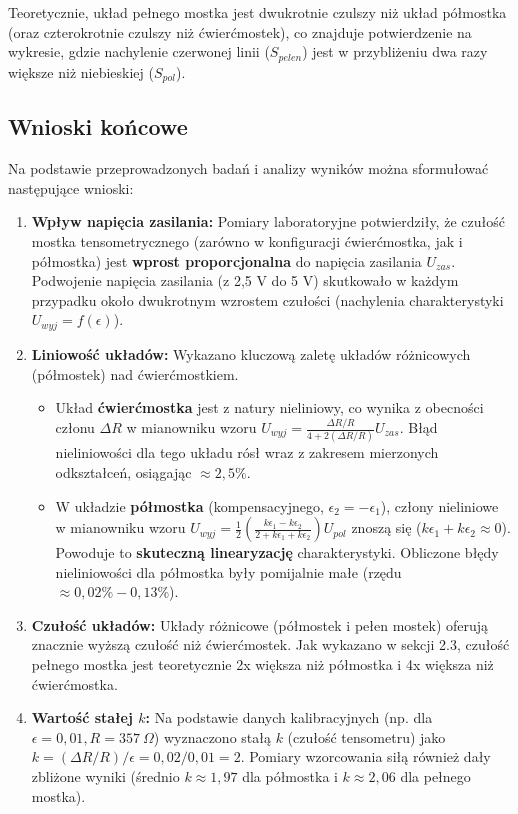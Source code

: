 \documentclass[12pt, a4paper]{article}
\begin{document}
	Teoretycznie, układ pełnego mostka jest dwukrotnie czulszy niż układ półmostka (oraz czterokrotnie czulszy niż ćwierćmostek), co znajduje potwierdzenie na wykresie, gdzie nachylenie czerwonej linii ($S_{pelen}$) jest w przybliżeniu dwa razy większe niż niebieskiej ($S_{pol}$).
	
	\subsection{Wnioski końcowe}
	
	Na podstawie przeprowadzonych badań i analizy wyników można sformułować następujące wnioski:
	
	\begin{enumerate}
		\item \textbf{Wpływ napięcia zasilania:} Pomiary laboratoryjne potwierdziły, że czułość mostka tensometrycznego (zarówno w konfiguracji ćwierćmostka, jak i półmostka) jest \textbf{wprost proporcjonalna} do napięcia zasilania $U_{zas}$. Podwojenie napięcia zasilania (z 2,5 V do 5 V) skutkowało w każdym przypadku około dwukrotnym wzrostem czułości (nachylenia charakterystyki $U_{wyj} = f(\epsilon)$).
		
		\item \textbf{Liniowość układów:} Wykazano kluczową zaletę układów różnicowych (półmostek) nad ćwierćmostkiem. 
		\begin{itemize}
			\item Układ \textbf{ćwierćmostka} jest z natury nieliniowy, co wynika z obecności członu $\Delta R$ w mianowniku wzoru $U_{wyj} = \frac{\Delta R/R}{4+2(\Delta R/R)}U_{zas}$. Błąd nieliniowości dla tego układu rósł wraz z zakresem mierzonych odkształceń, osiągając $\approx 2,5\%$.
			\item W układzie \textbf{półmostka} (kompensacyjnego, $\epsilon_2 = -\epsilon_1$), człony nieliniowe w mianowniku wzoru $U_{wyj} = \frac{1}{2}(\frac{k\epsilon_1 - k\epsilon_2}{2+k\epsilon_1+k\epsilon_2})U_{pol}$ znoszą się ($k\epsilon_1+k\epsilon_2 \approx 0$). Powoduje to \textbf{skuteczną linearyzację} charakterystyki. Obliczone błędy nieliniowości dla półmostka były pomijalnie małe (rzędu $\approx 0,02\%-0,13\%$).
		\end{itemize}
		
		\item \textbf{Czułość układów:} Układy różnicowe (półmostek i pełen mostek) oferują znacznie wyższą czułość niż ćwierćmostek. Jak wykazano w sekcji 2.3, czułość pełnego mostka jest teoretycznie 2x większa niż półmostka i 4x większa niż ćwierćmostka.
		
		\item \textbf{Wartość stałej $k$:} Na podstawie danych kalibracyjnych (np. dla $\epsilon=0,01, R=357~\Omega$) wyznaczono stałą $k$ (czułość tensometru) jako $k = (\Delta R/R) / \epsilon = 0,02 / 0,01 = 2$. Pomiary wzorcowania siłą również dały zbliżone wyniki (średnio $k \approx 1,97$ dla półmostka i $k \approx 2,06$ dla pełnego mostka).
	\end{enumerate}
	
\end{document}

